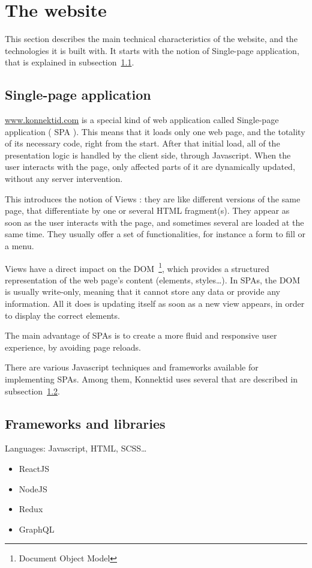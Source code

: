 \section{The website}
\label{sec:website}

This section describes the main technical characteristics of the website, and the technologies it is built with.
It starts with the notion of Single-page application, that is explained in {\sc subsection}~\ref{ssec:spa}.

\subsection{Single-page application}
\label{ssec:spa}

\url{www.konnektid.com} is a special kind of web application called Single-page application (\guillemotleft{} SPA \guillemotright{}).
This means that it loads only one web page, and the totality of its necessary code, right from the start.
After that initial load, all of the presentation logic is handled by the client side, through Javascript.
When the user interacts with the page, only affected parts of it are dynamically updated, without any server intervention.

This introduces the notion of \guillemotleft{} Views \guillemotright{}: they are like different versions of the same page, that differentiate by one or several HTML fragment(s).
They appear as soon as the user interacts with the page, and sometimes several are loaded at the same time.
They usually offer a set of functionalities, for instance a form to fill or a menu.

Views have a direct impact on the DOM~\footnote{Document Object Model}, which provides a structured representation of the web page's content (elements, styles\ldots).
In SPAs, the DOM is usually write-only, meaning that it cannot store any data or provide any information.
All it does is updating itself as soon as a new view appears, in order to display the correct elements.

The main advantage of SPAs is to create a more fluid and responsive user experience, by avoiding page reloads.

There are various Javascript techniques and frameworks available for implementing SPAs.
Among them, Konnektid uses several that are described in {\sc subsection}~\ref{ssec:frameworks}.

\subsection{Frameworks and libraries}
\label{ssec:frameworks}

Languages: Javascript, HTML, SCSS\ldots

\begin{itemize}
    \item ReactJS
    \item NodeJS
    \item Redux
    \item GraphQL
\end{itemize}
